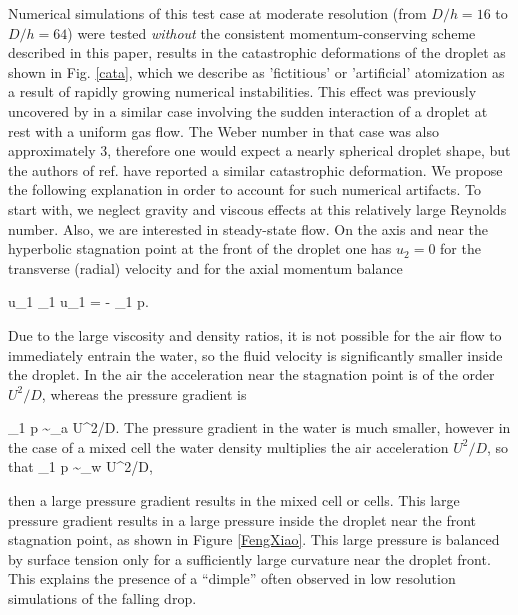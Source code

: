Numerical simulations of this test case at moderate resolution (from $D/h=16$ to $D/h=64$) were tested \textit{without} the consistent momentum-conserving scheme described in this paper, results in the catastrophic deformations of the droplet as shown in Fig. \ref{cata}, which we describe as 'fictitious' or 'artificial' atomization as a result of rapidly growing numerical instabilities. This effect was previously uncovered by \cite{Xiao:2014vs} in a similar case involving the sudden interaction of a droplet at rest with a uniform gas flow. The Weber number in that case was also approximately 3, therefore one would expect a nearly spherical droplet shape, but the authors of ref. \cite{Xiao:2014vs} have reported a similar catastrophic deformation. We propose the following explanation in order to account for such numerical artifacts. To start with, we neglect gravity and viscous effects at this relatively large Reynolds number. Also, we are interested in steady-state flow. On the axis and near the hyperbolic stagnation point at the front of the droplet one has $u_2=0$ for the transverse (radial) velocity and for the axial momentum balance

\be
u_1 \partial_1 u_1 = -  \rho \partial_1 p.
\nd

Due to the large viscosity and density ratios, it is not possible for the air flow to immediately entrain the water, so the fluid velocity is significantly smaller inside the droplet. In the air the acceleration near the stagnation point is of the order $U^2/D$, whereas the pressure gradient is

\be
\partial_1 p \sim \rho_{a} U^2/D.
\nd
The pressure gradient in the water is much smaller, however in the case of a mixed cell the water density multiplies the air acceleration $U^2/D$, so that
\be
\partial_1 p \sim \rho_{w} U^2/D,
\nd

then a large pressure gradient results in the mixed cell or cells. This large pressure gradient results in a large pressure inside the droplet near the front stagnation point, as shown in Figure \ref{FengXiao}. This large pressure is balanced by surface tension only for a sufficiently large curvature near the droplet front. This explains the presence of a ``dimple'' often observed in low resolution simulations of the falling drop. 

